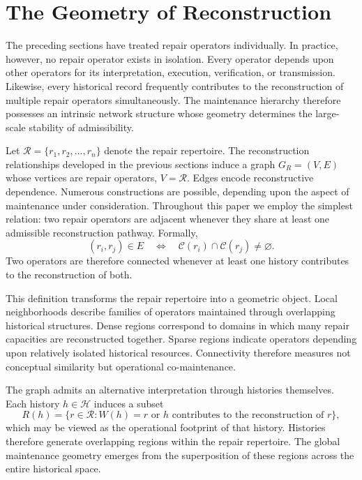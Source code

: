 \documentclass[12pt,oneside]{article}
\theoremstyle{plain}
\theoremstyle{definition}
\theoremstyle{remark}
\theoremstyle{plain}
\newcommand{\Hist}{\mathcal{H}}
\begin{document}
\section{The Geometry of Reconstruction}

The preceding sections have treated repair operators individually. In practice, however, no repair
operator exists in isolation. Every operator depends upon other operators for its interpretation,
execution, verification, or transmission. Likewise, every historical record frequently contributes
to the reconstruction of multiple repair operators simultaneously. The maintenance hierarchy
therefore possesses an intrinsic network structure whose geometry determines the large-scale
stability of admissibility.

Let $\mathcal{R} = \{r_1, r_2, \ldots, r_n\}$ denote the repair repertoire. The reconstruction
relationships developed in the previous sections induce a graph $G_R = (V, E)$ whose vertices are
repair operators, $V = \mathcal{R}$. Edges encode reconstructive dependence. Numerous constructions
are possible, depending upon the aspect of maintenance under consideration. Throughout this paper
we employ the simplest relation: two repair operators are adjacent whenever they share at least one
admissible reconstruction pathway. Formally,
\[
(r_i, r_j) \in E
\quad\Longleftrightarrow\quad
\mathcal{C}(r_i) \cap \mathcal{C}(r_j) \neq \varnothing.
\]
Two operators are therefore connected whenever at least one history contributes to the
reconstruction of both.

This definition transforms the repair repertoire into a geometric object. Local neighborhoods
describe families of operators maintained through overlapping historical structures. Dense regions
correspond to domains in which many repair capacities are reconstructed together. Sparse regions
indicate operators depending upon relatively isolated historical resources. Connectivity therefore
measures not conceptual similarity but operational co-maintenance.

The graph admits an alternative interpretation through histories themselves. Each history $h \in
\Hist$ induces a subset
\[
R(h) = \{r \in \mathcal{R} : W(h) = r
\text{ or }
h \text{ contributes to the reconstruction of } r\},
\]
which may be viewed as the operational footprint of that history. Histories therefore generate
overlapping regions within the repair repertoire. The global maintenance geometry emerges from the
superposition of these regions across the entire historical space.
\end{document}
